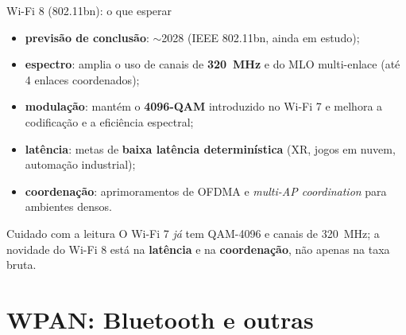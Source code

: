 \documentclass[aspectratio=169,11pt]{beamer}
\begin{document}
\begin{frame}{Wi-Fi 8 (802.11bn): o que esperar}
  \begin{itemize}
    \item \textbf{previsão de conclusão}: $\sim$2028 (IEEE 802.11bn, ainda em estudo);
    \item \textbf{espectro}: amplia o uso de canais de \textbf{320~MHz} e do MLO multi-enlace (até 4 enlaces coordenados);
    \item \textbf{modulação}: mantém o \textbf{4096-QAM} introduzido no Wi-Fi 7 e melhora a codificação e a eficiência espectral;
    \item \textbf{latência}: metas de \textbf{baixa latência determinística} (XR, jogos em nuvem, automação industrial);
    \item \textbf{coordenação}: aprimoramentos de OFDMA e \emph{multi-AP coordination} para ambientes densos.
  \end{itemize}
  \begin{exampleblock}{Cuidado com a leitura}
    O Wi-Fi 7 \emph{já} tem QAM-4096 e canais de 320~MHz; a novidade do Wi-Fi 8 está na \textbf{latência} e na \textbf{coordenação}, não apenas na taxa bruta.
  \end{exampleblock}
\end{frame}

\section{WPAN: Bluetooth e outras}
\end{document}
